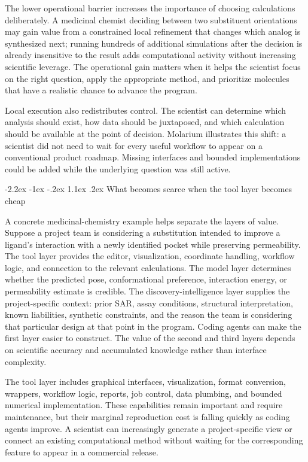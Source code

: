 \documentclass[11pt]{article}
\makeatletter
\renewcommand\section{\@startsection{section}{1}{\z@}%
  {-2.2ex \@plus -1ex \@minus -.2ex}%
  {1.1ex \@plus .2ex}%
  {\normalfont\Large\bfseries\color{molblue}}}
\makeatother
\begin{document}
The lower operational barrier increases the importance of choosing calculations deliberately. A medicinal chemist deciding between two substituent orientations may gain value from a constrained local refinement that changes which analog is synthesized next; running hundreds of additional simulations after the decision is already insensitive to the result adds computational activity without increasing scientific leverage. The operational gain matters when it helps the scientist focus on the right question, apply the appropriate method, and prioritize molecules that have a realistic chance to advance the program.

Local execution also redistributes control. The scientist can determine which analysis should exist, how data should be juxtaposed, and which calculation should be available at the point of decision. Molarium illustrates this shift: a scientist did not need to wait for every useful workflow to appear on a conventional product roadmap. Missing interfaces and bounded implementations could be added while the underlying question was still active.

\section{What becomes scarce when the tool layer becomes cheap}

A concrete medicinal-chemistry example helps separate the layers of value. Suppose a project team is considering a substitution intended to improve a ligand's interaction with a newly identified pocket while preserving permeability. The tool layer provides the editor, visualization, coordinate handling, workflow logic, and connection to the relevant calculations. The model layer determines whether the predicted pose, conformational preference, interaction energy, or permeability estimate is credible. The discovery-intelligence layer supplies the project-specific context: prior SAR, assay conditions, structural interpretation, known liabilities, synthetic constraints, and the reason the team is considering that particular design at that point in the program. Coding agents can make the first layer easier to construct. The value of the second and third layers depends on scientific accuracy and accumulated knowledge rather than interface complexity.

The tool layer includes graphical interfaces, visualization, format conversion, wrappers, workflow logic, reports, job control, data plumbing, and bounded numerical implementation. These capabilities remain important and require maintenance, but their marginal reproduction cost is falling quickly as coding agents improve. A scientist can increasingly generate a project-specific view or connect an existing computational method without waiting for the corresponding feature to appear in a commercial release.
\end{document}
